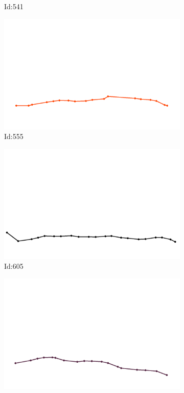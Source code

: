 \documentclass[12pt,twoside]{report}
\begin{document}
\begin{figure}
\begin{subfigure}[b]{0.20\textwidth}
\caption{Id:541}
\end{subfigure}
\begin{subfigure}[b]{0.20\textwidth}
\centering
\includegraphics[width=\textwidth]{../trajectories/555.png}
\caption{Id:555}
\end{subfigure}
\begin{subfigure}[b]{0.20\textwidth}
\centering
\includegraphics[width=\textwidth]{../trajectories/605.png}
\caption{Id:605}
\end{subfigure}
\begin{subfigure}[b]{0.20\textwidth}
\centering
\includegraphics[width=\textwidth]{../trajectories/613.png}

\end{subfigure}
\end{figure}
\end{document}
